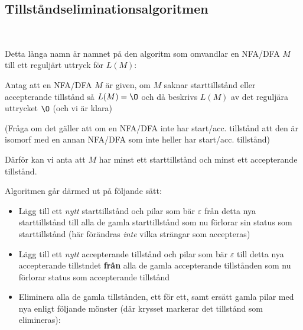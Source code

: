 \subsection{Tillståndseliminationsalgoritmen}\hfill\\\par
\noindent Detta långa namn är namnet på den algoritm som omvandlar en NFA/DFA $M$ till ett reguljärt uttryck för $L(M)$:
\par\bigskip
\noindent Antag att en NFA/DFA $M$ är given, om $M$ saknar starttillstånd eller accepterande tillstånd så $L(M) = \O$ och då beskrivs $L(M)$ av det reguljära uttrycket $\O$ (och vi är klara)\par\bigskip
(Fråga om det gäller att om en NFA/DFA inte har start/acc. tillstånd att den är isomorf med en annan NFA/DFA som inte heller har start/acc. tillstånd)
\par\bigskip
\noindent Därför kan vi anta att $M$ har minst ett starttillstånd och minst ett accepterande tillstånd.
\par\bigskip
\noindent Algoritmen går därmed ut på följande sätt:
\begin{itemize}
  \item Lägg till ett \textit{nytt} starttillstånd och pilar som bär $\varepsilon$ från detta nya starttillstånd till alla de gamla starttillstånd som nu förlorar sin status som starttillstånd (här förändras \textit{inte} vilka strängar som accepteras)
  \item Lägg till ett \textit{nytt} accepterande tillstånd och pilar som bär $\varepsilon$ till detta nya accepterande tillstndet \textbf{från} alla de gamla accepterande tillstånden som nu förlorar status som accepterande tillstånd
  \item Eliminera alla de gamla tillstånden, ett för ett, samt ersätt gamla pilar med nya enligt följande mönster (där krysset markerar det tillstånd som elimineras):
\end{itemize}
\begin{figure}[ht]
    \centering
    \caption{}
\end{figure}
